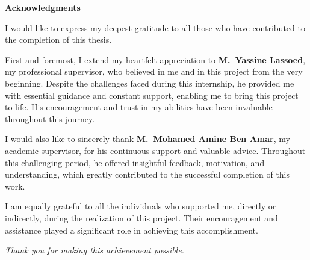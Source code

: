 \thispagestyle{plain}
\begin{center}
    {\Large \textbf{Acknowledgments}}
\end{center}

\vspace{0.6cm}

I would like to express my deepest gratitude to all those who have contributed to the completion of this thesis.

\vspace{0.3cm}

First and foremost, I extend my heartfelt appreciation to \textbf{M.\ Yassine Lassoed}, my professional supervisor, who believed in me and in this project from the very beginning. Despite the challenges faced during this internship, he provided me with essential guidance and constant support, enabling me to bring this project to life. His encouragement and trust in my abilities have been invaluable throughout this journey.

\vspace{0.3cm}

I would also like to sincerely thank \textbf{M.\ Mohamed Amine Ben Amar}, my academic supervisor, for his continuous support and valuable advice. Throughout this challenging period, he offered insightful feedback, motivation, and understanding, which greatly contributed to the successful completion of this work.

\vspace{0.3cm}

I am equally grateful to all the individuals who supported me, directly or indirectly, during the realization of this project. Their encouragement and assistance played a significant role in achieving this accomplishment.

\vspace{0.8cm}

\hfill \textit{Thank you for making this achievement possible.}
